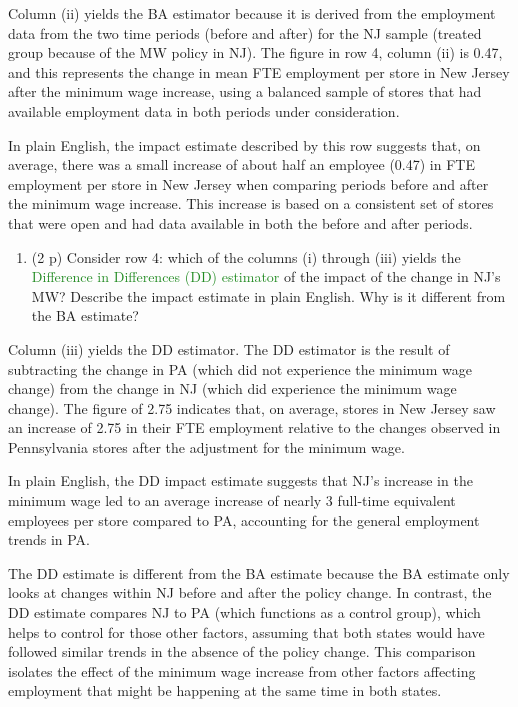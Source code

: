 \documentclass[
]{article}
\providecommand{\tightlist}{%
  \setlength{\itemsep}{0pt}\setlength{\parskip}{0pt}}
\begin{document}
Column (ii) yields the BA estimator because it is derived from the
employment data from the two time periods (before and after) for the NJ
sample (treated group because of the MW policy in NJ). The figure in row
4, column (ii) is 0.47, and this represents the change in mean FTE
employment per store in New Jersey after the minimum wage increase,
using a balanced sample of stores that had available employment data in
both periods under consideration.

In plain English, the impact estimate described by this row suggests
that, on average, there was a small increase of about half an employee
(0.47) in FTE employment per store in New Jersey when comparing periods
before and after the minimum wage increase. This increase is based on a
consistent set of stores that were open and had data available in both
the before and after periods.

\begin{enumerate}
\def\labelenumi{\alph{enumi}.}
\setcounter{enumi}{3}
\tightlist
\item
  (2 p) Consider row 4: which of the columns (i) through (iii) yields
  the \textcolor{ForestGreen}{Difference in Differences (DD) estimator}
  of the impact of the change in NJ's MW? Describe the impact estimate
  in plain English. Why is it different from the BA estimate?
\end{enumerate}

Column (iii) yields the DD estimator. The DD estimator is the result of
subtracting the change in PA (which did not experience the minimum wage
change) from the change in NJ (which did experience the minimum wage
change). The figure of 2.75 indicates that, on average, stores in New
Jersey saw an increase of 2.75 in their FTE employment relative to the
changes observed in Pennsylvania stores after the adjustment for the
minimum wage.

In plain English, the DD impact estimate suggests that NJ's increase in
the minimum wage led to an average increase of nearly 3 full-time
equivalent employees per store compared to PA, accounting for the
general employment trends in PA.

The DD estimate is different from the BA estimate because the BA
estimate only looks at changes within NJ before and after the policy
change. In contrast, the DD estimate compares NJ to PA (which functions
as a control group), which helps to control for those other factors,
assuming that both states would have followed similar trends in the
absence of the policy change. This comparison isolates the effect of the
minimum wage increase from other factors affecting employment that might
be happening at the same time in both states.
\end{document}
